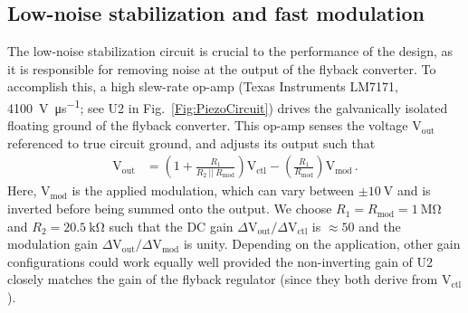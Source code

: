 \documentclass[aip,rsi,reprint]{revtex4-1} %
\begin{document}
\subsection{Low-noise stabilization and fast modulation}
\label{Sec:LowNoiseStabilization}



%
%
%

The low-noise stabilization circuit is crucial to the performance of the design, as it is responsible for removing noise at the output of the flyback converter.
To accomplish this, a high slew-rate op-amp (Texas Instruments LM7171, \SI[per-mode=symbol]{4100}{\volt\per\micro\second}; see U2 in Fig.~\ref{Fig:PiezoCircuit}) drives the galvanically isolated floating ground of the flyback converter.
This op-amp senses the voltage $\text{V}_\text{out}$ referenced to true circuit ground, and adjusts its output such that
\begin{align}
\text{V}_\text{out} &= \left(1 + \frac{R_1}{R_2~||~R_\text{mod}}\right) \text{V}_\text{ctl} -
\left(\frac{R_1}{R_\text{mod}}\right) \text{V}_\text{mod}\,.
\label{Eq:FullTransferFunc}
\end{align}
Here, $\text{V}_\text{mod}$ is the applied modulation, which can vary between $\pm\SI{10}{\volt}$ and is inverted before being summed onto the output.
We choose $R_1 = R_\text{mod} = \SI{1}{\mega\ohm}$ and $R_2 = \SI{20.5}{\kilo\ohm}$ such that the DC gain $\Delta\text{V}_\text{out}/\Delta\text{V}_\text{ctl}$ is $\approx 50$ and the modulation gain $\Delta\text{V}_\text{out}/\Delta\text{V}_\text{mod}$ is unity.
Depending on the application, other gain configurations could work equally well provided the non-inverting gain of U2 closely matches the gain of the flyback regulator (since they both derive from $\text{V}_\text{ctl}$).
\end{document}
